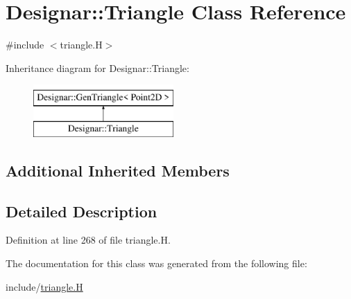 \hypertarget{class_designar_1_1_triangle}{}\section{Designar\+:\+:Triangle Class Reference}
\label{class_designar_1_1_triangle}


{\ttfamily \#include $<$triangle.\+H$>$}

Inheritance diagram for Designar\+:\+:Triangle\+:\begin{figure}[H]
\begin{center}
\leavevmode
\includegraphics[height=2.000000cm]{class_designar_1_1_triangle}
\end{center}
\end{figure}
\subsection*{Additional Inherited Members}


\subsection{Detailed Description}


Definition at line 268 of file triangle.\+H.



The documentation for this class was generated from the following file\+:\begin{DoxyCompactItemize}
\item 
include/\hyperlink{triangle_8_h}{triangle.\+H}\end{DoxyCompactItemize}
